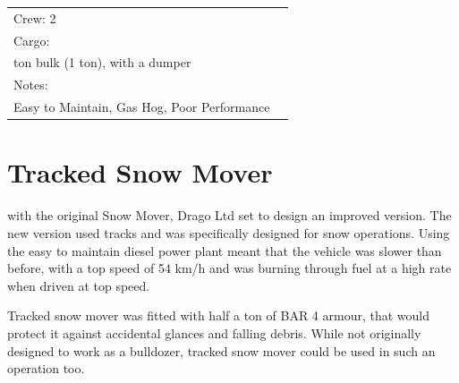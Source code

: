 \documentclass{tufte-book}
\begin{document}
\begin{minipage}{\textwidth}
\begin{center}
\begin{tabular}{llll}
\multicolumn{3}{l}{Crew: 2} \\
Cargo: & & \\
\multicolumn{3}{l}{\quad 1 ton bulk (1 ton), with a dumper} \\

Notes: & & \\
\multicolumn{3}{l}{\quad Easy to Maintain, Gas Hog, Poor Performance} \\
\bottomrule
\end{tabular}
\end{center}
\end{minipage}


\section{Tracked Snow Mover}
 with the original Snow Mover, Drago Ltd set to design an
improved version. The new version used tracks and was specifically
designed for snow operations. Using the easy to maintain diesel power
plant meant that the vehicle was slower than before, with a top speed
of 54 km/h and was burning through fuel at a high rate when driven at top
speed.

Tracked snow mover was fitted with half a ton of BAR 4 armour, that would
protect it against accidental glances and falling debris. While not
originally designed to work as a bulldozer, tracked snow mover could be used
in such an operation too.
\end{document}
